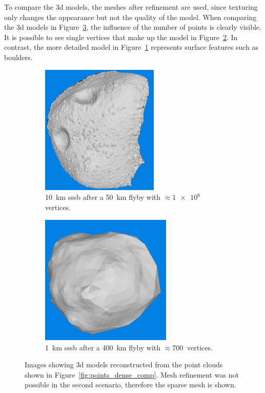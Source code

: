 To compare the \gls{3d} models, the meshes after refinement are used, since texturing only changes the appearance but not the quality of the model. When comparing the \gls{3d} models in Figure~\ref{fig:models_comp}, the influence of the number of points is clearly visible. It is possible to see single vertices that make up the model in Figure~\ref{fig:models_400_1}. In contrast, the more detailed model in Figure~\ref{fig:models_50_10} represents surface features such as boulders.

\begin{figure}[htb]
    \centering
        \begin{subfigure}[b]{0.42\textwidth}
            \centering
            \includegraphics[width=\textwidth,height=6.2cm]{doc/thesis/0_figures/models_quality/50_10/120_50_10_refine2.png}
            \caption{\SI{10}{\kilo\meter} \gls{sssb} after a \SI{50}{\kilo\meter} flyby with $\approx\SI{1e6}{}$ vertices.} %
            \label{fig:models_50_10}
        \end{subfigure}
        \begin{subfigure}[b]{0.42\textwidth}
            \centering
            \includegraphics[width=\textwidth,height=6.2cm]{doc/thesis/0_figures/models_quality/400_1/120_400_1_mesh2.png}
            \caption{\SI{1}{\kilo\meter} \gls{sssb} after a \SI{400}{\kilo\meter} flyby with $\approx\SI{700}{}$ vertices.}
            \label{fig:models_400_1}
        \end{subfigure}
    \caption{Images showing \gls{3d} models reconstructed from the point clouds shown in Figure~\ref{fig:points_dense_comp}. Mesh refinement was not possible in the second scenario, therefore the sparse mesh is shown.}
    \label{fig:models_comp}
\end{figure}

